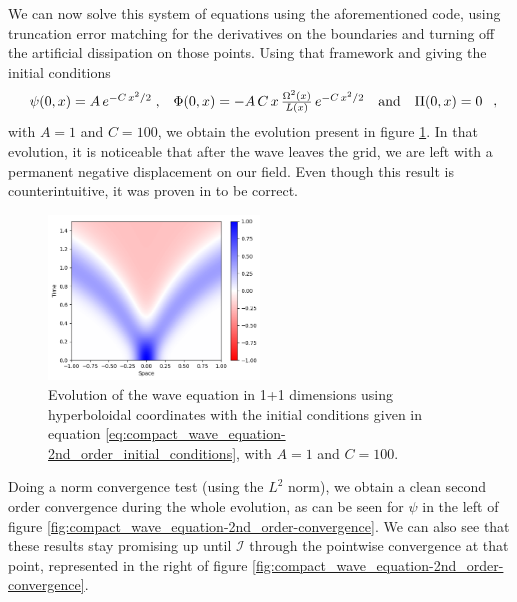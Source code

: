 We can now solve this system of equations using the aforementioned code, using truncation error matching for the derivatives on the boundaries and turning off the artificial dissipation on those points. Using that framework and giving the initial conditions
\begin{equation}
    \begin{array}{c c c c}
        \psi(0,x) = A \, e^{-C \, x^2/2} \; , & \Phi(0,x) = - A \,C \, x \, \frac{\Omega^2(x)}{L(x)} \, e^{-C \, x^2/2} & \text{and} & \Pi(0,x) = 0
    \end{array} \; ,
    \label{eq:compact_wave_equation-2nd_order_initial_conditions}
\end{equation}
with $A = 1$ and $C = 100$, we obtain the evolution present in figure \ref{fig:compact_wave_equation-2nd_order}. In that evolution, it is noticeable that after the wave leaves the grid, we are left with a permanent negative displacement on our field. Even though this result is counterintuitive, it was proven in \cite{} to be correct.

\begin{figure}[h]
    \centering
    \includegraphics[width=0.5\textwidth]{Images/Wave_Equation_1+1-Solution.png}
    \caption{Evolution of the wave equation in 1+1 dimensions using hyperboloidal coordinates with the initial conditions given in equation \eqref{eq:compact_wave_equation-2nd_order_initial_conditions}, with $A = 1$ and $C = 100$.}
    \label{fig:compact_wave_equation-2nd_order}
\end{figure}

Doing a norm convergence test (using the $L^2$ norm), we obtain a clean second order convergence during the whole evolution, as can be seen for $\psi$ in the left of figure \ref{fig:compact_wave_equation-2nd_order-convergence}. We can also see that these results stay promising up until $\mathscr{I}$ through the pointwise convergence at that point, represented in the right of figure \ref{fig:compact_wave_equation-2nd_order-convergence}.

